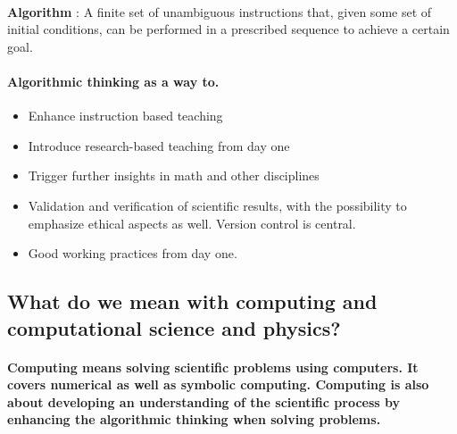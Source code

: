 \documentclass[%
oneside,                 %
final,                   %
10pt]{article}
\begin{document}
\paragraph{}
\textbf{Algorithm} : A finite set of unambiguous instructions that, given some set of initial conditions, can be performed in a prescribed sequence to achieve a certain goal.




\paragraph{Algorithmic  thinking as a way to.}

\begin{itemize}
\item Enhance instruction based teaching

\item Introduce research-based teaching  from day one

\item Trigger further insights in math and other disciplines 

\item Validation and verification of scientific results, with the possibility to emphasize ethical aspects as well. Version control is central.

\item Good working practices from day one.
\end{itemize}

\noindent





\subsection{What do we mean with computing and computational science and physics?}

\paragraph{}

\textbf{Computing means solving scientific problems using computers. It covers numerical as well as symbolic computing. Computing is also about developing an understanding of the scientific process by enhancing the algorithmic thinking when solving problems.}
\end{document}

